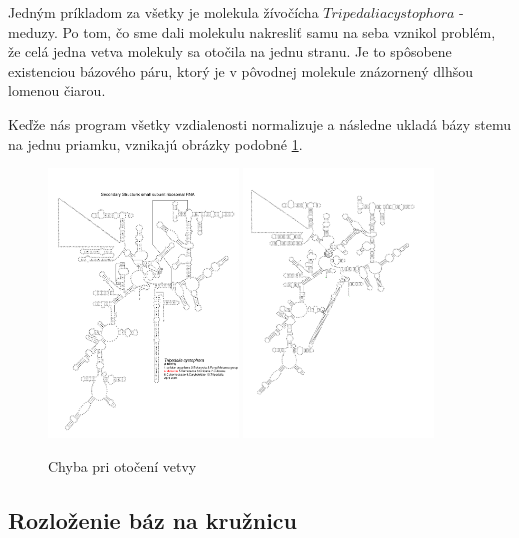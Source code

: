 Jedným príkladom za všetky je molekula žívočícha $Tripedalia cystophora$ - meduzy.
Po tom, čo sme dali molekulu nakresliť samu na seba vznikol problém, že celá jedna
vetva molekuly sa otočila na jednu stranu. Je to spôsobene existenciou bázového páru,
ktorý je v pôvodnej molekule znázornený dlhšou lomenou čiarou.

Keďže nás program všetky vzdialenosti normalizuje a následne ukladá bázy stemu na jednu priamku,
vznikajú obrázky podobné \ref{obr:chyba_otočenie_vetvy}.

\begin{figure}
  \includegraphics[width=0.45\textwidth]{../img/chyby/tripedalia_cystophora}
  \includegraphics[width=0.45\textwidth]{../img/chyby/tripedalia_cystophora-tripedalia_cystophora}
  \caption{Chyba pri otočení vetvy}
  \label{obr:chyba_otočenie_vetvy}
\end{figure}

\subsection{Rozloženie báz na kružnicu}

